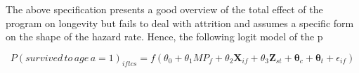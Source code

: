 The above specification presents a good overview of the total effect of the program on longevity but fails to deal with attrition and assumes a specific form on the shape of the hazard rate. Hence, the following logit model of the p

$$
P(survived\,to\,age\,a=1)_{iftcs} = f(\theta_0 + \theta_1MP_f + \theta_2\mathbf{X}_{if} + \theta_3\mathbf{Z}_{st} + \mathbf{\theta}_c + \mathbf{\theta}_t + \epsilon_{if})
$$